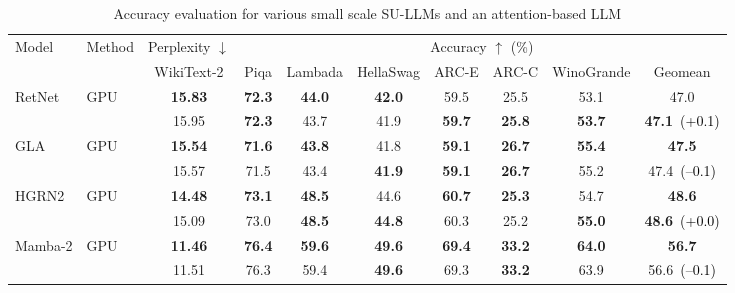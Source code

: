 \begingroup
\begin{table}[t]
  \caption{Accuracy evaluation for various small scale SU-LLMs and an
  attention-based LLM}
  \label{tab:accuracy}
  \begin{center}
    \begin{tabular}{llcccccccc}
      \toprule[1pt]
      \multirow{2}{*}{\vspace{-1.5ex}Model} &
      \multirow{2}{*}{\vspace{-1.5ex}Method} &
      Perplexity $\downarrow$ &
      \multicolumn{7}{c}{Accuracy $\uparrow$ (\%)} \\
      \cmidrule(lr){3-3} \cmidrule(lr){4-10}
      & & WikiText-2 & Piqa & Lambada & HellaSwag & ARC-E & ARC-C &
      WinoGrande & Geomean \\

      \midrule[1pt]
      \multirow{2}{*}{RetNet} & GPU & \textbf{15.83} & \textbf{72.3}
      & \textbf{44.0} & \textbf{42.0} & 59.5 & 25.5 &
      53.1 & 47.0 \\ & \sysname{} & 15.95 &
      \textbf{72.3} & 43.7 & 41.9 & \textbf{59.7} & \textbf{25.8} &
      \textbf{53.7} & \textbf{47.1}~\textcolor{black}{(+0.1)} \\

      \midrule
      \multirow{2}{*}{GLA} & GPU & \textbf{15.54} & \textbf{71.6} &
      \textbf{43.8} & 41.8 & \textbf{59.1} & \textbf{26.7} &
      \textbf{55.4} & \textbf{47.5} \\ &
      \sysname{} & 15.57 & 71.5 & 43.4 & \textbf{41.9} & \textbf{59.1}
      & \textbf{26.7} & 55.2 &
      47.4~\textcolor{black}{(--0.1)}\\

      \midrule
      \multirow{2}{*}{HGRN2} & GPU & \textbf{14.48} &
      \textbf{73.1} & \textbf{48.5} & 44.6 & \textbf{60.7} & \textbf{25.3} &
      54.7 & \textbf{48.6} \\
      & \sysname{} & 15.09 & 73.0 & \textbf{48.5} &
      \textbf{44.8} & 60.3 & 25.2 & \textbf{55.0} &
      \textbf{48.6}~\textcolor{black}{(+0.0)}\\

      \midrule
      \multirow{2}{*}{Mamba-2} & GPU & \textbf{11.46} &
      \textbf{76.4} & \textbf{59.6} & \textbf{49.6} & \textbf{69.4} &
      \textbf{33.2} & \textbf{64.0} & \textbf{56.7} \\
      & \sysname{} & 11.51 & 76.3 & 59.4 & \textbf{49.6} & 69.3 &
      \textbf{33.2} & 63.9 & 56.6~\textcolor{black}{(--0.1)} \\


\end{tabular}
\end{center}
\end{table}
